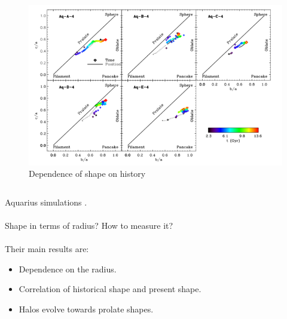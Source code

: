 \documentclass[xcolor=dvipsnames]{beamer}
\begin{document}
\begin{frame}
\begin{columns}[c]
\begin{column}{.7\textwidth}
\centering
\begin{figure}
\includegraphics[width=1\linewidth]{./pics/shapeHistory.png}
\caption{\tiny Dependence of shape on history}
\end{figure}

\end{column}

\end{columns}

\end{frame}

\begin{frame}

Aquarius simulations \cite{aquarius}.\\~\\

Shape in terms of radius? How to measure it? \\~\\

Their main results are: 

\begin{itemize}
\item Dependence on the radius.

\item Correlation of historical shape and present shape.

\item Halos evolve towards prolate shapes.

\end{itemize}

\end{frame}
\end{document}

